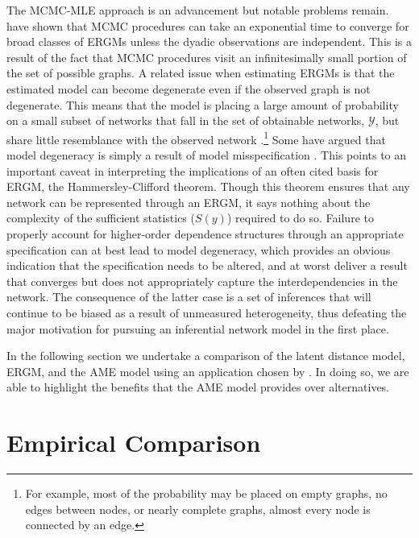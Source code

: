 \documentclass[11pt,pdflatex]{elsarticle}
\begin{document}
The MCMC-MLE approach is an advancement but notable problems remain. \citet{chatterjee:diaconis:2013} have shown that MCMC procedures can take an exponential time to converge for broad classes of ERGMs unless the dyadic observations are independent. This is a result of the fact that MCMC procedures visit an infinitesimally small portion of the set of possible graphs. A related issue when estimating ERGMs is that the estimated model can become degenerate even if the observed graph is not degenerate. This means that the model is placing a large amount of probability on a small subset of networks that fall in the set of obtainable networks, $\mathcal{Y}$, but share little resemblance with the observed network \citep{schweinberger:2011}.\footnote{For example, most of the probability may be placed on empty graphs, no edges between nodes, or nearly complete graphs, almost every node is connected by an edge.} Some have argued that model degeneracy is simply a result of model misspecification \citep{goodreau:etal:2008,handcock:etal:2008}. This points to an important caveat in interpreting the implications of an often cited basis for ERGM, the Hammersley-Clifford theorem. Though this theorem ensures that any network can be represented through an ERGM, it says nothing about the complexity of the sufficient statistics ($S(y)$) required to do so. Failure to properly account for higher-order dependence structures through an appropriate specification can at best lead to model degeneracy, which provides an obvious indication that the specification needs to be altered, and at worst deliver a result that converges but does not appropriately capture the interdependencies in the network. The consequence of the latter case is a set of inferences that will continue to be biased as a result of unmeasured heterogeneity, thus defeating the major motivation for pursuing an inferential network model in the first place.

In the following section we undertake a comparison of the latent distance model, ERGM, and the AME model using an application chosen by \citet{cranmer:etal:2016}. In doing so, we are able to highlight the benefits that the AME model provides over alternatives.

\section{\textbf{Empirical Comparison}} 

\end{document}
